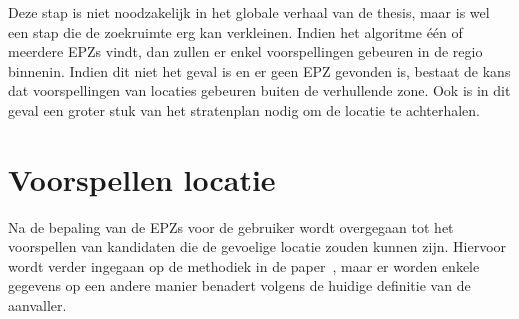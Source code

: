 Deze stap is niet noodzakelijk in het globale verhaal van de thesis, maar is
wel een stap die de zoekruimte erg kan verkleinen. Indien het algoritme één of
meerdere \acp{EPZ} vindt, dan zullen er enkel voorspellingen gebeuren in de
regio binnenin. Indien dit niet het geval is en er geen \ac{EPZ} gevonden is,
bestaat de kans dat voorspellingen van locaties gebeuren buiten de verhullende
zone. Ook is in dit geval een groter stuk van het stratenplan nodig om de
locatie te achterhalen.

\section{Voorspellen locatie}
Na de bepaling van de \acp{EPZ} voor de gebruiker wordt overgegaan tot het
voorspellen van kandidaten die de gevoelige locatie zouden kunnen zijn.
Hiervoor wordt verder ingegaan op de methodiek in de
paper~\citeauthor{Dhondt_Pochat_Voulimeneas_Joosen_Volckaert_2022}, maar er
worden enkele gegevens op een andere manier benadert volgens de huidige
definitie van de aanvaller.

